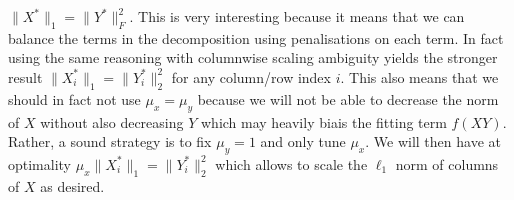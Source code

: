 \documentclass[a4paper, 11pt]{article}
\begin{document}
\begin{itemize}
  \( \|X^\ast\|_1 = \|Y^\ast\|_F^2 \). This is very interesting because it means that we can balance the terms in the decomposition using penalisations on each term. In fact using the same reasoning with columnwise scaling ambiguity yields the stronger result \( \|X^\ast_i\|_1 = \|Y^\ast_i\|_2^2 \) for any column/row index \( i \). This also means that we should in fact not use \( \mu_x = \mu_y \) because we will not be able to decrease the norm of \( X \) without also decreasing \( Y \) which may heavily biais the fitting term \( f(XY) \). Rather, a sound strategy is to fix \(\mu_y = 1 \) and only tune \( \mu_x \). We will then have at optimality \( \mu_x\|X^\ast_i\|_1 = \|Y^\ast_i\|_2^2  \) which allows to scale the \( \ell_1 \) norm of columns of \( X \) as desired.
\end{itemize}



\end{document}
